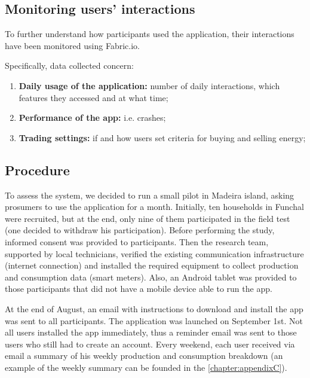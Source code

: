 \subsection{Monitoring users’ interactions}

To further understand how participants used the application, their interactions have been monitored using Fabric.io. 


Specifically, data collected concern:
\begin{enumerate}
    \item \textbf{Daily usage of the application:} number of daily interactions, which features they accessed and at what time;
    \item \textbf{Performance of the app:} i.e. crashes;
    \item \textbf{Trading settings:} if and how users set criteria for buying and selling energy;
\end{enumerate}

\subsection{Procedure}

To assess the system, we decided to run a small pilot in Madeira island, asking prosumers to use the application for a month. Initially, ten households in Funchal were recruited, but at the end, only nine of them participated in the field test (one decided to withdraw his participation).
 Before performing the study, informed consent was provided to participants. Then the research team, supported by local technicians, verified the existing communication infrastructure (internet connection) and installed the required equipment to collect production and consumption data (smart meters). Also, an Android tablet was provided to those participants that did not have a mobile device able to run the app.

At the end of August, an email with instructions to download and install the app was sent to all participants. The application was launched on September 1st. Not all users installed the app immediately, thus a reminder email was sent to those users who still had to create an account.
 Every weekend, each user received via email a summary of his weekly production and consumption breakdown (an example of the weekly summary can be founded in the \cref{chapter:appendixC}).
 
